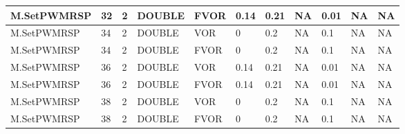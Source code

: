 {\begin{longtable}{|l|l|l|l|l|l|l|l|l|l|l|}
M.SetPWMRSP & 32 & 2 & DOUBLE & FVOR & 0.14 & 0.21 & NA & 0.01 & NA & NA \\ \hline
M.SetPWMRSP & 34 & 2 & DOUBLE & VOR & 0 & 0.2 & NA & 0.1 & NA & NA \\ \hline
M.SetPWMRSP & 34 & 2 & DOUBLE & FVOR & 0 & 0.2 & NA & 0.1 & NA & NA \\ \hline
M.SetPWMRSP & 36 & 2 & DOUBLE & VOR & 0.14 & 0.21 & NA & 0.01 & NA & NA \\ \hline
M.SetPWMRSP & 36 & 2 & DOUBLE & FVOR & 0.14 & 0.21 & NA & 0.01 & NA & NA \\ \hline
M.SetPWMRSP & 38 & 2 & DOUBLE & VOR & 0 & 0.2 & NA & 0.1 & NA & NA \\ \hline
M.SetPWMRSP & 38 & 2 & DOUBLE & FVOR & 0 & 0.2 & NA & 0.1 & NA & NA \\ \hline
\end{longtable}}
